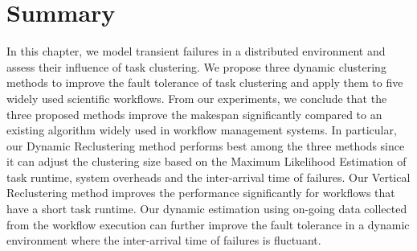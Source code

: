 \section{Summary}
In this chapter, we model transient failures in a distributed environment and assess their influence of task clustering. We propose three dynamic clustering methods to improve the fault tolerance of task clustering and apply them to five widely used scientific workflows. From our experiments, we conclude that the three proposed methods improve the makespan significantly compared to an existing algorithm widely used in workflow management systems. In particular, our Dynamic Reclustering method performs best among the three methods since it can adjust the clustering size based on the Maximum Likelihood Estimation of task runtime, system overheads and the inter-arrival time of failures. Our Vertical Reclustering method improves the performance significantly for  workflows that have a short task runtime. Our dynamic estimation using on-going data collected from the workflow execution can further improve the fault tolerance in a dynamic environment where the inter-arrival time of failures is fluctuant. 
